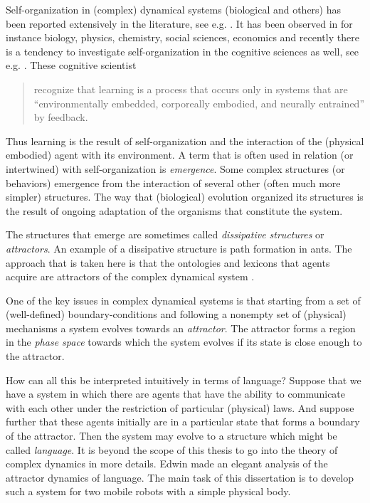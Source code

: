 Self-organization in (complex) dynamical systems (biological and others) has been reported extensively in the literature, see e.g. \cite{prigogine,maynard-smith:1995}. It has been observed in for instance biology, physics, chemistry, social sciences, economics and recently there is a tendency to investigate self-organization in the cognitive sciences as well, see e.g. \cite{edelman:1992,smiththelen:1993}. These cognitive scientist

\begin{quote}
recognize that learning is a process that occurs only in systems that are ``environmentally embedded, corporeally embodied, and neurally entrained'' by feedback. \cite[p. 738]{wilsonkeil:1999}
\end{quote}

Thus learning is the result of self-organization and the interaction of the (physical embodied) agent with its environment. A term that is often used in relation (or intertwined) with self-organization is {\em emergence}. Some complex structures (or behaviors) emergence from the interaction of several other (often much more simpler) structures. The way that (biological) evolution organized its structures is the result of ongoing adaptation of the organisms that constitute the system. 


The structures that emerge are sometimes called {\em dissipative structures} \cite{prigogine} or {\em attractors}. An example of a dissipative structure is path formation in ants. The approach that is taken here is that the ontologies and lexicons that agents acquire are attractors of the complex dynamical system \cite{steels:1996a}. 

One of the key issues in complex dynamical systems is that starting from a set of (well-defined) boundary-conditions and following a nonempty set of (physical) mechanisms a system evolves towards an {\em attractor}. The attractor forms a region in the {\em phase space} towards which the system evolves if its state is close enough to the attractor. 

How can all this be interpreted intuitively in terms of language? Suppose that we have a system in which there are agents that have the ability to communicate with each other under the restriction of particular (physical) laws. And suppose further that these agents initially are in a particular state that forms a boundary of the attractor. Then the system may evolve to a structure which might be called {\em language}. It is beyond the scope of this thesis to go into the theory of complex dynamics in more details. Edwin  made an elegant analysis of the attractor dynamics of language. The main task of this dissertation is to develop such a system for two mobile robots with a simple physical body.

